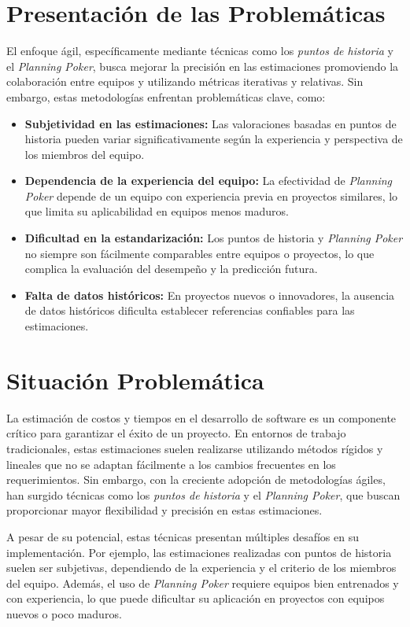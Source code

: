 \section{Presentación de las Problemáticas}

El enfoque ágil, específicamente mediante técnicas como los \textit{puntos de historia} y el \textit{Planning Poker}, busca mejorar la precisión en las estimaciones promoviendo la colaboración entre equipos y utilizando métricas iterativas y relativas. Sin embargo, estas metodologías enfrentan problemáticas clave, como:

\begin{itemize}
    \item \textbf{Subjetividad en las estimaciones:} Las valoraciones basadas en puntos de historia pueden variar significativamente según la experiencia y perspectiva de los miembros del equipo.
    \item \textbf{Dependencia de la experiencia del equipo:} La efectividad de \textit{Planning Poker} depende de un equipo con experiencia previa en proyectos similares, lo que limita su aplicabilidad en equipos menos maduros.
    \item \textbf{Dificultad en la estandarización:} Los puntos de historia y \textit{Planning Poker} no siempre son fácilmente comparables entre equipos o proyectos, lo que complica la evaluación del desempeño y la predicción futura.
    \item \textbf{Falta de datos históricos:} En proyectos nuevos o innovadores, la ausencia de datos históricos dificulta establecer referencias confiables para las estimaciones.
\end{itemize}


\section{Situación Problemática}

La estimación de costos y tiempos en el desarrollo de software es un componente crítico para garantizar el éxito de un proyecto. En entornos de trabajo tradicionales, estas estimaciones suelen realizarse utilizando métodos rígidos y lineales que no se adaptan fácilmente a los cambios frecuentes en los requerimientos. Sin embargo, con la creciente adopción de metodologías ágiles, han surgido técnicas como los \textit{puntos de historia} y el \textit{Planning Poker}, que buscan proporcionar mayor flexibilidad y precisión en estas estimaciones.

A pesar de su potencial, estas técnicas presentan múltiples desafíos en su implementación. Por ejemplo, las estimaciones realizadas con puntos de historia suelen ser subjetivas, dependiendo de la experiencia y el criterio de los miembros del equipo. Además, el uso de \textit{Planning Poker} requiere equipos bien entrenados y con experiencia, lo que puede dificultar su aplicación en proyectos con equipos nuevos o poco maduros.

